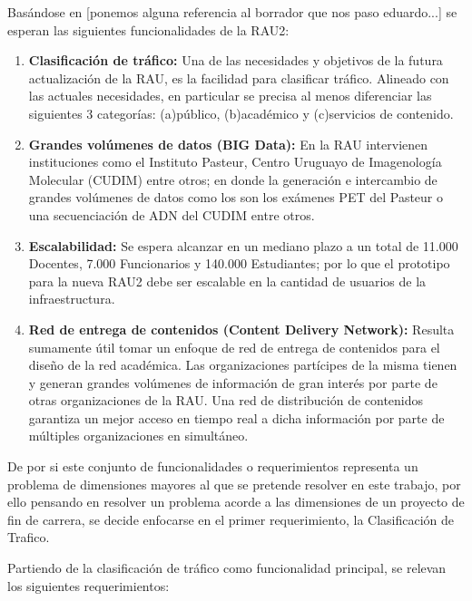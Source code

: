 Basándose en [ponemos alguna referencia al borrador que nos paso eduardo...] se esperan las siguientes funcionalidades de la RAU2:

\begin{enumerate}
\item \textbf{Clasificación de tráfico:} Una de las necesidades y objetivos de la futura actualizaci\'on de la RAU, es la facilidad para clasificar tráfico. Alineado con las actuales necesidades, en particular se precisa al menos diferenciar las siguientes 3 categorías: (a)público, (b)académico y (c)servicios de contenido.

\item \textbf{Grandes volúmenes de datos (BIG Data):} En la RAU intervienen instituciones como el Instituto Pasteur, Centro Uruguayo de Imagenología Molecular (CUDIM) entre otros; en donde la generación e intercambio de grandes volúmenes de datos como los son los exámenes PET del Pasteur o una secuenciación de ADN del CUDIM entre otros.

\item \textbf{Escalabilidad:} Se espera alcanzar en un mediano plazo a un total de 11.000 Docentes, 7.000 Funcionarios y 140.000 Estudiantes; por lo que el prototipo para la nueva RAU2 debe ser escalable en la cantidad de usuarios de la infraestructura.

\item \textbf{Red de entrega de contenidos (Content Delivery Network):} Resulta sumamente útil tomar un enfoque de red de entrega de contenidos para el diseño de la red académica. Las organizaciones partícipes de la misma tienen y generan grandes volúmenes de información de gran interés por parte de otras organizaciones de la RAU. Una red de distribución de contenidos garantiza un mejor acceso en tiempo real a dicha información por parte de múltiples organizaciones en simultáneo. 
 
\end{enumerate}

De por si este conjunto de funcionalidades o requerimientos representa un problema de dimensiones mayores al que se pretende resolver en este trabajo, por ello pensando en resolver un problema acorde a las dimensiones de un proyecto de fin de carrera, se decide enfocarse en el primer requerimiento, la Clasificación de Trafico.

Partiendo de la clasificación de tr\'afico como funcionalidad principal, se relevan los siguientes requerimientos:

